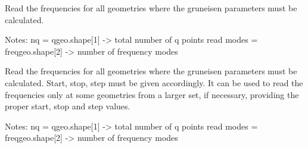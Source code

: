 \documentclass[letterpaper,10pt,english]{sphinxmanual}
\begin{document}

\begin{fulllineitems}
\label{pyqha:pyqha.read.read_freq_ext_geo}
Read the frequencies for all geometries where the gruneisen parameters must be
calculated.

Notes:
nq = qgeo.shape{[}1{]} -\textgreater{} total number of q points read
modes = freqgeo.shape{[}2{]} -\textgreater{} number of frequency modes

\end{fulllineitems}


\begin{fulllineitems}
\label{pyqha:pyqha.read.read_freq_geo}
Read the frequencies for all geometries where the gruneisen parameters must be
calculated. Start, stop, step must be given accordingly. It can be used to read
the frequencies only at some geometries from a larger set, if necessary, 
providing the proper start, stop and step values.

Notes:
nq = qgeo.shape{[}1{]} -\textgreater{} total number of q points read
modes = freqgeo.shape{[}2{]} -\textgreater{} number of frequency modes

\end{fulllineitems}

\end{document}
